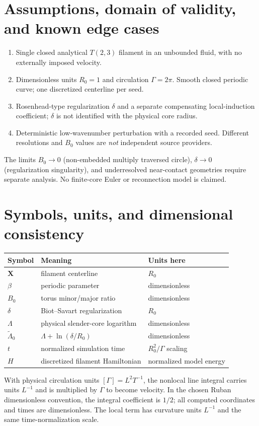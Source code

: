 \documentclass[11pt,a4paper]{article}
\begin{document}

\section{Assumptions, domain of validity, and known edge cases}
\begin{enumerate}[label=A\arabic*.]
\item Single closed analytical $T(2,3)$ filament in an unbounded fluid, with no externally imposed velocity.
\item Dimensionless units $R_0=1$ and circulation $\Gamma=2\pi$. Smooth closed periodic curve; one discretized centerline per seed.
\item Rosenhead-type regularization $\delta$ and a separate compensating local-induction coefficient; $\delta$ is not identified with the physical core radius.
\item Deterministic low-wavenumber perturbation with a recorded seed. Different resolutions and $B_0$ values are \emph{not} independent source providers.
\end{enumerate}
\noindent The limits $B_0\to0$ (non-embedded multiply traversed circle), $\delta\to0$ (regularization singularity), and underresolved near-contact geometries require separate analysis. No finite-core Euler or reconnection model is claimed.


\section{Symbols, units, and dimensional consistency}
\begin{center}\begin{tabular}{lll}\toprule Symbol & Meaning & Units here\\\midrule
$\mathbf X$ & filament centerline & $R_0$\\
$\beta$ & periodic parameter & dimensionless\\
$B_0$ & torus minor/major ratio & dimensionless\\
$\delta$ & Biot--Savart regularization & $R_0$\\
$\Lambda$ & physical slender-core logarithm & dimensionless\\
$\widetilde\Lambda_0$ & $\Lambda+\ln(\delta/R_0)$ & dimensionless\\
$t$ & normalized simulation time & $R_0^2/\Gamma$ scaling\\
$H$ & discretized filament Hamiltonian & normalized model energy\\\bottomrule\end{tabular}\end{center}
\noindent With physical circulation units $[\Gamma]=L^2T^{-1}$, the nonlocal line integral carries units $L^{-1}$ and is multiplied by $\Gamma$ to become velocity. In the chosen Ruban dimensionless convention, the integral coefficient is $1/2$; all computed coordinates and times are dimensionless. The local term has curvature units $L^{-1}$ and the same time-normalization scale.
\end{document}

